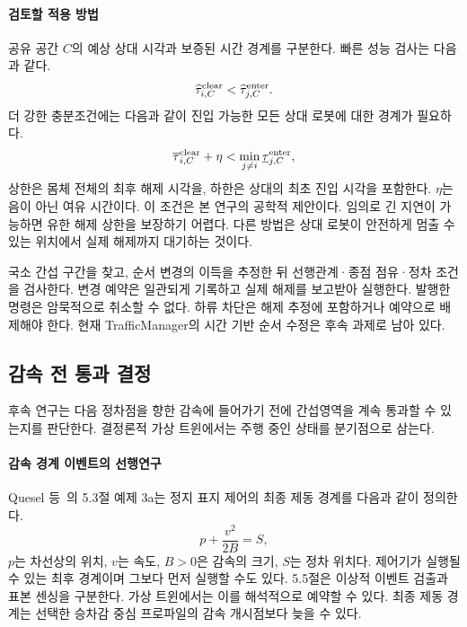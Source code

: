 \documentclass[11pt,a4paper]{article}
\theoremstyle{remark}
\begin{document}
\paragraph{검토할 적용 방법}
공유 공간 $C$의 예상 상대 시각과 보증된 시간 경계를 구분한다. 빠른 성능 검사는 다음과 같다.
\begin{equation}
 \widehat{\tau}^{\rm clear}_{i,C}
 < \widehat{\tau}^{\rm enter}_{j,C}.
 \label{eq:estimated-gap}
\end{equation}
더 강한 충분조건에는 다음과 같이 진입 가능한 모든 상대 로봇에 대한 경계가 필요하다.
\begin{equation}
 \overline{\tau}^{\rm clear}_{i,C}+\eta
 <\min_{j\ne i}\underline{\tau}^{\rm enter}_{j,C},
 \label{eq:bounded-gap}
\end{equation}
상한은 몸체 전체의 최후 해제 시각을, 하한은 상대의 최초 진입 시각을 포함한다. $\eta$는 음이 아닌 여유 시간이다. 이 조건은 본 연구의 공학적 제안이다. 임의로 긴 지연이 가능하면 유한 해제 상한을 보장하기 어렵다. 다른 방법은 상대 로봇이 안전하게 멈출 수 있는 위치에서 실제 해제까지 대기하는 것이다.

국소 간섭 구간을 찾고, 순서 변경의 이득을 추정한 뒤 선행관계·종점 점유·정차 조건을 검사한다. 변경 예약은 일관되게 기록하고 실제 해제를 보고받아 실행한다. 발행한 명령은 암묵적으로 취소할 수 없다. 하류 차단은 해제 추정에 포함하거나 예약으로 배제해야 한다. 현재 TrafficManager의 시간 기반 순서 수정은 후속 과제로 남아 있다.

\subsection{감속 전 통과 결정}
\label{sec:prebraking-review}
후속 연구는 다음 정차점을 향한 감속에 들어가기 전에 간섭영역을 계속 통과할 수 있는지를 판단한다. 결정론적 가상 트윈에서는 주행 중인 상태를 분기점으로 삼는다.

\paragraph{감속 경계 이벤트의 선행연구}
Quesel 등~\cite{quesel2016}의 5.3절 예제 3a는 정지 표지 제어의 최종 제동 경계를 다음과 같이 정의한다.
\begin{equation}
 p+\frac{v^2}{2B}=S,
 \label{eq:braking-boundary}
\end{equation}
$p$는 차선상의 위치, $v$는 속도, $B>0$은 감속의 크기, $S$는 정차 위치다. 제어기가 실행될 수 있는 최후 경계이며 그보다 먼저 실행할 수도 있다. 5.5절은 이상적 이벤트 검출과 표본 센싱을 구분한다. 가상 트윈에서는 이를 해석적으로 예약할 수 있다. 최종 제동 경계는 선택한 승차감 중심 프로파일의 감속 개시점보다 늦을 수 있다.
\end{document}
